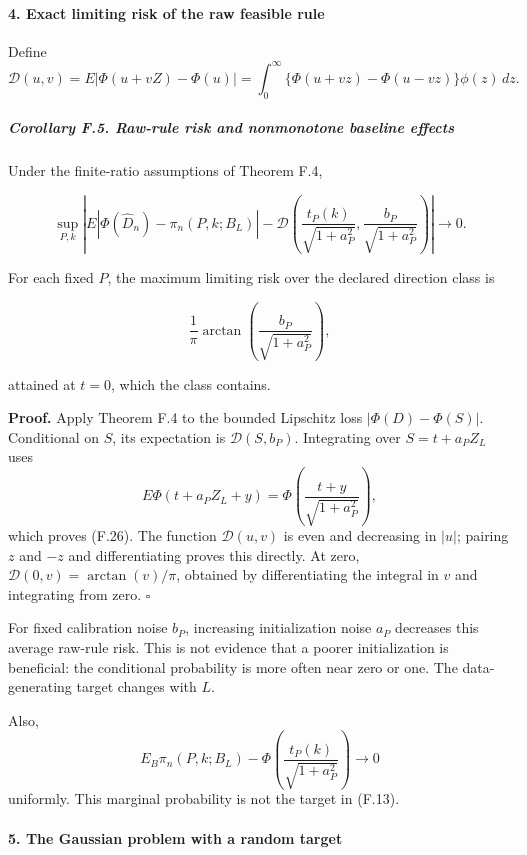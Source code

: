 \paragraph{4. Exact limiting risk of the raw feasible
rule}\label{exact-limiting-risk-of-the-raw-feasible-rule}

Define \[
\mathcal D(u,v)
=E|\Phi(u+vZ)-\Phi(u)|
=\int_0^\infty\{\Phi(u+vz)-\Phi(u-vz)\}\phi(z)\,dz.
\tag{F.25}
\]

\subparagraph{Corollary F.5. Raw-rule risk and nonmonotone baseline
effects}\label{corollary-f.5.-raw-rule-risk-and-nonmonotone-baseline-effects}

Under the finite-ratio assumptions of Theorem F.4,

\[
\sup_{P,k}\left|
E|\Phi(\widehat D_n)-\pi_n(P,k;B_L)|
-
\mathcal D\!\left(
\frac{t_P(k)}{\sqrt{1+a_P^2}},
\frac{b_P}{\sqrt{1+a_P^2}}
\right)
\right|\longrightarrow0.
\tag{F.26}
\]

For each fixed \(P\), the maximum limiting risk over the declared
direction class is

\[
\frac1\pi\arctan\!\left(
\frac{b_P}{\sqrt{1+a_P^2}}\right),
\tag{F.27}
\]

attained at \(t=0\), which the class contains.

\textbf{Proof.} Apply Theorem F.4 to the bounded Lipschitz loss
\(|\Phi(D)-\Phi(S)|\). Conditional on \(S\), its expectation is
\(\mathcal D(S,b_P)\). Integrating over \(S=t+a_PZ_L\) uses \[
E\Phi(t+a_PZ_L+y)
=\Phi\!\left(\frac{t+y}{\sqrt{1+a_P^2}}\right),
\] which proves (F.26). The function \(\mathcal D(u,v)\) is even and
decreasing in \(|u|\); pairing \(z\) and \(-z\) and differentiating
proves this directly. At zero, \(\mathcal D(0,v)=\arctan(v)/\pi\),
obtained by differentiating the integral in \(v\) and integrating from
zero. \(\square\)

For fixed calibration noise \(b_P\), increasing initialization noise
\(a_P\) decreases this average raw-rule risk. This is not evidence that
a poorer initialization is beneficial: the conditional probability is
more often near zero or one. The data-generating target changes with
\(L\).

Also, \[
E_B\pi_n(P,k;B_L)
-\Phi\!\left(\frac{t_P(k)}{\sqrt{1+a_P^2}}\right)\longrightarrow0
\tag{F.28}
\] uniformly. This marginal probability is not the target in (F.13).

\paragraph{5. The Gaussian problem with a random
target}\label{the-gaussian-problem-with-a-random-target}


